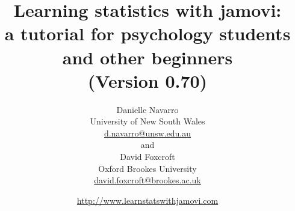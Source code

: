 


\date{\url{http://www.learnstatswithjamovi.com} \hfill \\ }
\title{Learning statistics with jamovi:\\ a tutorial for psychology students and other beginners \vspace*{12pt}
\\ (Version 0.70) \\ \vspace*{24pt}}
\author{Danielle Navarro \\ University of New South Wales \\ \url{d.navarro@unsw.edu.au} \vspace*{12pt} \\
and \vspace*{12pt} \\
David Foxcroft \\ Oxford Brookes University \\ \url{david.foxcroft@brookes.ac.uk} \vspace*{36pt}}


 
